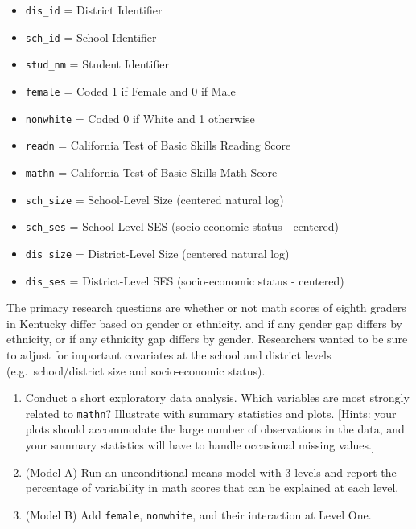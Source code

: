 \documentclass[
]{krantz}
\providecommand{\tightlist}{%
  \setlength{\itemsep}{0pt}\setlength{\parskip}{0pt}}
\begin{document}
\begin{enumerate}
  \begin{itemize}
  \tightlist
  \item
    \texttt{dis\_id} = District Identifier
  \item
    \texttt{sch\_id} = School Identifier
  \item
    \texttt{stud\_nm} = Student Identifier
  \item
    \texttt{female} = Coded 1 if Female and 0 if Male
  \item
    \texttt{nonwhite} = Coded 0 if White and 1 otherwise
  \item
    \texttt{readn} = California Test of Basic Skills Reading Score
  \item
    \texttt{mathn} = California Test of Basic Skills Math Score
  \item
    \texttt{sch\_size} = School-Level Size (centered natural log)
  \item
    \texttt{sch\_ses} = School-Level SES (socio-economic status - centered)
  \item
    \texttt{dis\_size} = District-Level Size (centered natural log)
  \item
    \texttt{dis\_ses} = District-Level SES (socio-economic status - centered)
  \end{itemize}

  The primary research questions are whether or not math scores of eighth graders in Kentucky differ based on gender or ethnicity, and if any gender gap differs by ethnicity, or if any ethnicity gap differs by gender. Researchers wanted to be sure to adjust for important covariates at the school and district levels (e.g.~school/district size and socio-economic status).

  \begin{enumerate}
  \def\labelenumii{\alph{enumii}.}
  \tightlist
  \item
    Conduct a short exploratory data analysis. Which variables are most strongly related to \texttt{mathn}? Illustrate with summary statistics and plots. {[}Hints: your plots should accommodate the large number of observations in the data, and your summary statistics will have to handle occasional missing values.{]}
  \item
    (Model A) Run an unconditional means model with 3 levels and report the percentage of variability in math scores that can be explained at each level.
  \item
    (Model B) Add \texttt{female}, \texttt{nonwhite}, and their interaction at Level One.


\end{enumerate}
\end{enumerate}
\end{document}
